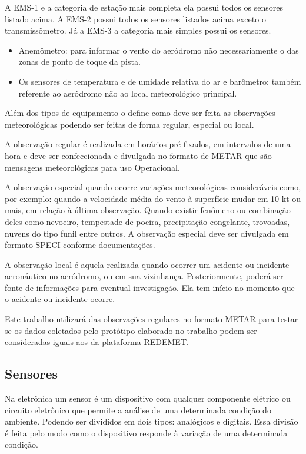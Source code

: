 A EMS-1 e a categoria de estação mais completa ela possui todos os sensores listado acima. A EMS-2 possui todos os sensores listados acima exceto o transmissômetro. Já a EMS-3 a categoria mais simples possui os sensores.
\begin{itemize}
    \item Anemômetro: para informar o vento do aeródromo não necessariamente o das zonas de ponto de toque da pista.
    \item Os sensores de temperatura e de umidade relativa do ar e barômetro: também referente ao aeródromo não ao local meteorológico principal.
\end{itemize}

Além dos tipos de equipamento o \cite{DECEA} define como deve ser feita as observações meteorológicas podendo ser feitas de forma regular, especial ou local.

A observação regular é realizada em horários pré-fixados, em intervalos de uma hora e deve ser confeccionada e divulgada no formato de METAR que são mensagens meteorológicas para uso Operacional.

A observação especial quando ocorre variações meteorológicas consideráveis como, por exemplo: quando a velocidade média do vento à superfície mudar em 10 kt ou mais, em relação à última observação. Quando existir fenômeno ou combinação deles como nevoeiro, tempestade de poeira, precipitação congelante, trovoadas, nuvens do tipo funil entre outros. A observação especial deve ser divulgada em formato SPECI conforme documentações.

A observação local é aquela realizada quando ocorrer um acidente ou incidente aeronáutico no aeródromo, ou em sua vizinhança. Posteriormente, poderá ser fonte de informações para eventual investigação. Ela tem início no momento que o acidente ou incidente ocorre. 

Este trabalho utilizará das observações regulares no formato METAR para testar se os dados coletados pelo protótipo elaborado no trabalho podem ser consideradas iguais aos da plataforma REDEMET.

\subsection{Sensores}

Na eletrônica um sensor é um dispositivo com qualquer componente elétrico ou circuito eletrônico que permite a análise de uma determinada condição do ambiente\cite{neto2020eletronica}. Podendo ser
divididos em dois tipos: analógicos e digitais. Essa divisão é feita pelo modo como o dispositivo responde à variação de uma determinada condição.


